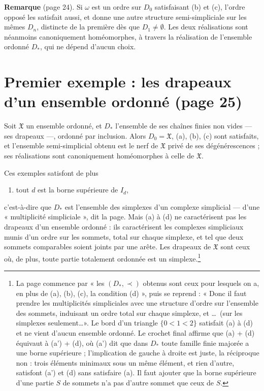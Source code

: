 \documentclass[11pt,a4paper]{article}
\begin{document}
\textbf{Remarque} (page 24). Si $\omega$ est un ordre sur $D_0$ satisfaisant
(b) et (c), l'ordre opposé les satisfait aussi, et donne une autre structure
semi-simpliciale sur les mêmes $D_n$, distincte de la première dès que $D_1
\neq \emptyset$. Les deux réalisations sont néanmoins canoniquement
homéomorphes, à travers la réalisation de l'ensemble ordonné $D_*$, qui ne
dépend d'aucun choix.

\section*{Premier exemple : les drapeaux d'un ensemble ordonné (page 25)}

Soit $\mathfrak{X}$ un ensemble ordonné, et $D_*$ l'ensemble de ses chaînes
finies non vides --- ses drapeaux ---, ordonné par inclusion. Alors $D_0 =
\mathfrak{X}$, (a), (b), (c) sont satisfaits, et l'ensemble semi-simplicial
obtenu est le nerf de $\mathfrak{X}$ privé de ses dégénérescences ; ses
réalisations sont canoniquement homéomorphes à celle de $\mathfrak{X}$.

Ces exemples satisfont de plus
\begin{enumerate}
  \item[(d)] tout $d$ est la borne supérieure de $I_d$,
\end{enumerate}
c'est-à-dire que $D_*$ est l'ensemble des simplexes d'un complexe
simplicial --- d'une « multiplicité simpliciale », dit la page. Mais (a) à (d)
ne caractérisent pas les drapeaux d'un ensemble ordonné : ils caractérisent
les complexes simpliciaux munis d'un ordre sur les sommets, total sur chaque
simplexe, et tel que deux sommets comparables soient joints par une arête. Les
drapeaux de $\mathfrak{X}$ sont ceux où, de plus, toute partie totalement
ordonnée est un simplexe.\footnote{La page commence par « les $(D_*, \prec)$
obtenus sont ceux pour lesquels on a, en plus de (a), (b), (c), la condition
(d) », puis se reprend : « Donc il faut prendre les multiplicités simpliciales
avec une structure d'ordre sur l'ensemble des sommets, induisant un ordre
total sur chaque simplexe, et \ldots\ (sur les simplexes seulement\ldots ».
Le bord d'un triangle $\{0 < 1 < 2\}$ satisfait (a) à (d) et ne vient d'aucun
ensemble ordonné. Le crochet final affirme que (a) + (d) équivaut à (a') +
(d), où (a') dit que dans $D_*$ toute famille finie majorée a une borne
supérieure ; l'implication de gauche à droite est juste, la réciproque non :
trois éléments minimaux sous un même élément, et rien d'autre, satisfont (a')
et (d) sans satisfaire (a). Il faut ajouter que la borne supérieure d'une
partie $S$ de sommets n'a pas d'autre sommet que ceux de $S$.}
\end{document}
